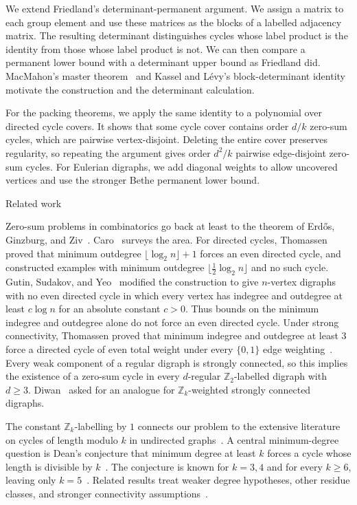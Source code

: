 \documentclass[11pt]{amsart}
\makeatletter
\def\subsection{\@startsection{subsection}{2}%
  \z@{1.05\linespacing\@plus.5\linespacing}{.4\linespacing}%
  {\normalfont\large\bfseries\raggedright}}
\theoremstyle{remark}
\makeatother
\begin{document}
We extend Friedland's determinant-permanent argument.  We assign a
matrix to each group element and use these matrices as the blocks of a
labelled adjacency matrix.  The resulting determinant distinguishes
cycles whose label product is the identity from those whose label
product is not.  We can then compare a permanent lower bound with a
determinant upper bound as Friedland did.  MacMahon's master
theorem~\cite{MacMahon,Chu} and Kassel and L\'evy's block-determinant
identity~\cite[Theorem~3.1]{KasselLevy} motivate the construction and
the determinant calculation.

For the packing theorems, we apply the same identity to a polynomial
over directed cycle covers.  It shows that some cycle cover contains
order $d/k$ zero-sum cycles, which are pairwise vertex-disjoint.
Deleting the entire cover preserves regularity, so repeating the
argument gives order $d^2/k$ pairwise edge-disjoint zero-sum cycles.
For Eulerian digraphs, we add diagonal weights to allow uncovered
vertices and use the stronger Bethe permanent lower bound.

\subsection{Related work}

Zero-sum problems in combinatorics go back at least to the theorem of
Erd\H{o}s, Ginzburg, and Ziv~\cite{ErdosGinzburgZiv}.  Caro~\cite{Caro}
surveys the area.  For directed cycles, Thomassen~\cite{Thomassen1985}
proved that minimum outdegree $\lfloor\log_2 n\rfloor+1$ forces an even
directed cycle, and constructed examples with minimum outdegree
$\lfloor\frac12\log_2 n\rfloor$ and no such cycle.  Gutin, Sudakov, and
Yeo~\cite{GutinSudakovYeo} modified the construction to give $n$-vertex
digraphs with no even directed cycle in which every vertex has indegree
and outdegree at least $c\log n$ for an absolute constant $c>0$.  Thus
bounds on the minimum indegree and outdegree alone do not force an even
directed cycle.  Under strong
connectivity, Thomassen
proved that minimum indegree and outdegree at least $3$ force a directed
cycle of even total weight under every $\{0,1\}$ edge
weighting~\cite{Thomassen1992}.  Every weak component of a regular digraph is
strongly connected, so this implies the existence of a zero-sum cycle
in every $d$-regular $\mathbb Z_2$-labelled digraph with $d\ge3$.
Diwan~\cite{Diwan} asked for an analogue for $\mathbb Z_k$-weighted
strongly connected digraphs.

The constant $\mathbb Z_k$-labelling by $1$ connects our problem to the
extensive literature on cycles of length modulo
$k$ in undirected graphs~\cite{Erdos1976,BollobasModulo,ThomassenModulo,SudakovVerstraete,BaiGrzesikLiProrok}.  A central minimum-degree question is Dean's conjecture that minimum degree at least $k$ forces a cycle whose length
is divisible by $k$~\cite{Dean1988}.  The conjecture is known for
$k=3,4$ and for every $k\ge6$, leaving only
$k=5$~\cite{ChenSaito,DeanLesniakSaito,LuoMaZhao}.  Related results treat
weaker degree hypotheses, other residue classes, and stronger connectivity
assumptions~\cite{GaoHuoLiuMa,BaiGrzesikLiProrok}.
\end{document}
